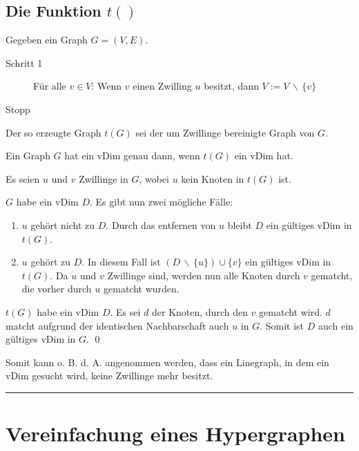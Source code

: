 \subsection{Die Funktion $t()$}
Gegeben ein Graph $G=(V,E)$.
\begin{description}
\item[Schritt 1] Für alle $v\in V$: Wenn $v$ einen Zwilling $u$ besitzt, dann $V:=V\,\backslash\,\{v\}$

\item[Stopp]
\end{description}

Der so erzeugte Graph $t(G)$ sei der um Zwillinge bereinigte Graph von $G$.

\begin{Lemma}
    Ein Graph $G$ hat ein vDim genau dann, wenn $t(G)$ ein vDim hat.
\end{Lemma}
\begin{Proof}
	Es seien $u$ und $v$ Zwillinge in $G$, wobei $u$ kein Knoten in $t(G)$ ist.
	
    \prR $G$ habe ein vDim $D$. Es gibt nun zwei mögliche Fälle:
    \begin{enumerate}
        \item $u$ gehört nicht zu $D$. Durch das entfernen von $u$ bleibt $D$ ein gültiges vDim in $t(G)$.
        \item $u$ gehört zu $D$. In diesem Fall ist $(D\,\backslash\,\{u\})\cup\{v\}$ ein gültiges vDim in $t(G)$. Da $u$ und $v$ Zwillinge sind, werden nun alle Knoten durch $v$ gematcht, die vorher durch $u$ gematcht wurden.
    \end{enumerate}

    \prL $t(G)$ habe ein vDim $D$. Es sei $d$ der Knoten, durch den $v$ gematcht wird. $d$ matcht aufgrund der identischen Nachbarschaft auch $u$ in $G$. Somit ist $D$ auch ein gültiges vDim in $G$.
    \qed
\end{Proof}

Somit kann o. B. d. A. angenommen werden, dass ein Linegraph, in dem ein vDim gesucht wird, keine Zwillinge mehr besitzt.

\rule{\linewidth}{1pt}
\clearpage


\section{Vereinfachung eines Hypergraphen}


